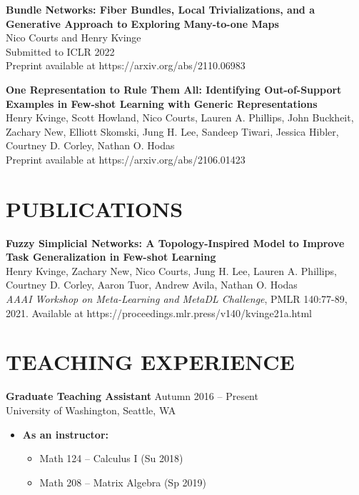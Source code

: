 \documentclass[margin]{res} %
\begin{document}
\begin{resume}
\textbf{Bundle Networks: Fiber Bundles, Local Trivializations, and a Generative Approach to Exploring Many-to-one Maps}\\
Nico Courts and Henry Kvinge\\
Submitted to ICLR 2022\\
Preprint available at https://arxiv.org/abs/2110.06983

\textbf{One Representation to Rule Them All: Identifying Out-of-Support Examples in Few-shot Learning with Generic Representations}\\
Henry Kvinge, Scott Howland, Nico Courts, Lauren A. Phillips, John Buckheit, Zachary New, Elliott Skomski, Jung H. Lee, Sandeep Tiwari, Jessica Hibler, Courtney D. Corley, Nathan O. Hodas\\
Preprint available at https://arxiv.org/abs/2106.01423

\section{PUBLICATIONS}

\textbf{Fuzzy Simplicial Networks: A Topology-Inspired Model to Improve Task Generalization in Few-shot Learning}\\
Henry Kvinge, Zachary New, Nico Courts, Jung H. Lee, Lauren A. Phillips, Courtney D. Corley, Aaron Tuor, Andrew Avila, Nathan O. Hodas\\
\textit{AAAI Workshop on Meta-Learning and MetaDL Challenge}, PMLR 140:77-89, 2021. Available at https://proceedings.mlr.press/v140/kvinge21a.html


 
\section{TEACHING EXPERIENCE}

{\bf Graduate Teaching Assistant} \hfill Autumn 2016 -- Present \\
University of Washington, Seattle, WA

\begin{itemize} \itemsep -1pt %
\item\textbf{As an instructor:} 
\begin{itemize}
	\item Math 124 -- Calculus I (Su 2018)
	\item Math 208 -- Matrix Algebra (Sp 2019)\vspace{5pt}


\end{itemize}
\end{itemize}
\end{resume}
\end{document}
